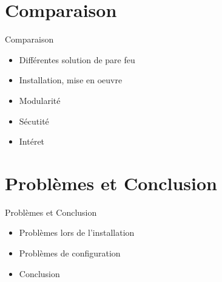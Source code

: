 \documentclass[t,12pt]{beamer}
\begin{document}
\section{Comparaison}                                                    %
\begin{frame}                                                         %
    \begin{center}{\textcolor{grisbleu}{\Large Comparaison}}\end{center} %
    \begin{itemize}                                                   %
	\item Différentes solution de pare feu
	\item Installation, mise en oeuvre
	\item Modularité
        \item Sécutité
        \item Intéret
\end{itemize}
\end{frame}                                                            %


\section{Problèmes et Conclusion}                                                    %
\begin{frame}                                                         %
    \begin{center}{\textcolor{grisbleu}{\Large Problèmes et Conclusion}}\end{center} %
    \begin{itemize}                                                   %
	\item Problèmes lors de l'installation
	\item Problèmes de configuration
	\item Conclusion
\end{itemize}
\end{frame}                                                            %
\end{document}
